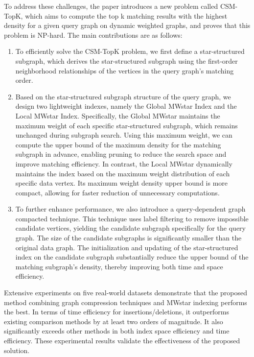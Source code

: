 \begin{enabstract}
	To address these challenges, the paper introduces a new problem called CSM-TopK, which aims to compute the top k matching results with the highest density for a given query graph on dynamic weighted graphs, and proves that this problem is NP-hard. 
	The main contributions are as follows:
	\begin{enumerate}[label=(\arabic*)]  
		\item To efficiently solve the CSM-TopK problem, we first define a star-structured subgraph, which derives the star-structured subgraph using the first-order neighborhood relationships of the vertices in the query graph’s matching order.
		\item Based on the star-structured subgraph structure of the query graph, we design two lightweight indexes, namely the Global MWstar Index and the Local MWstar Index. 
		Specifically, the Global MWstar maintains the maximum weight of each specific star-structured subgraph, which remains unchanged during subgraph search. 
		Using this maximum weight, we can compute the upper bound of the maximum density for the matching subgraph in advance, enabling pruning to reduce the search space and improve matching efficiency. 
		In contrast, the Local MWstar dynamically maintains the index based on the maximum weight distribution of each specific data vertex. 
		Its maximum weight density upper bound is more compact, allowing for faster reduction of unnecessary computations.
		\item To further enhance performance, we also introduce a query-dependent graph compacted technique. 
		This technique uses label filtering to remove impossible candidate vertices, yielding the candidate subgraph specifically for the query graph. 
		The size of the candidate subgraphs is significantly smaller than the original data graph. 
		The initialization and updating of the star-structured index on the candidate subgraph substantially reduce the upper bound of the matching subgraph’s density, thereby improving both time and space efficiency.
		\end{enumerate}

		Extensive experiments on five real-world datasets demonstrate that the proposed method combining graph compression techniques and MWstar indexing performs the best. 
		In terms of time efficiency for insertions/deletions, it outperforms existing comparison methods by at least two orders of magnitude. 
		It also significantly exceeds other methods in both index space efficiency and time efficiency. 
		These experimental results validate the effectiveness of the proposed solution.
\end{enabstract}